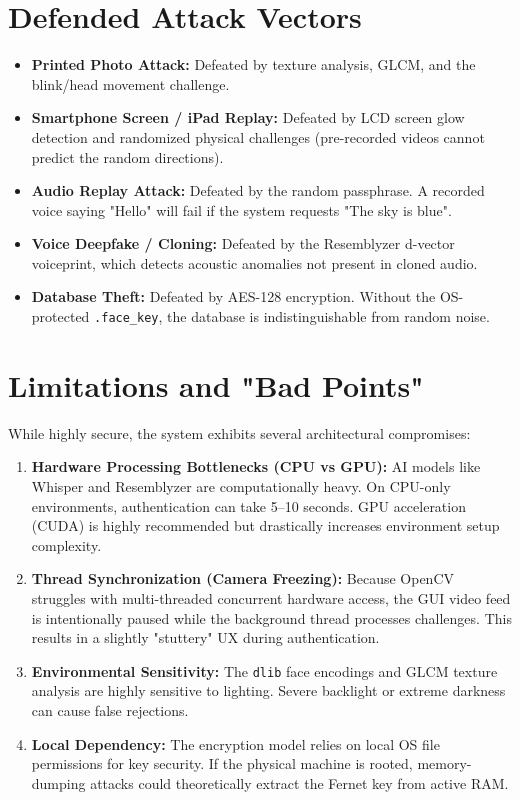 \documentclass[12pt,a4paper]{article}
\begin{document}
\section{Defended Attack Vectors}
\begin{itemize}
    \item \textbf{Printed Photo Attack:} Defeated by texture analysis, GLCM, and the blink/head movement challenge.
    \item \textbf{Smartphone Screen / iPad Replay:} Defeated by LCD screen glow detection and randomized physical challenges (pre-recorded videos cannot predict the random directions).
    \item \textbf{Audio Replay Attack:} Defeated by the random passphrase. A recorded voice saying "Hello" will fail if the system requests "The sky is blue".
    \item \textbf{Voice Deepfake / Cloning:} Defeated by the Resemblyzer d-vector voiceprint, which detects acoustic anomalies not present in cloned audio.
    \item \textbf{Database Theft:} Defeated by AES-128 encryption. Without the OS-protected \texttt{.face\_key}, the database is indistinguishable from random noise.
\end{itemize}

\section{Limitations and "Bad Points"}
While highly secure, the system exhibits several architectural compromises:
\begin{enumerate}
    \item \textbf{Hardware Processing Bottlenecks (CPU vs GPU):} AI models like Whisper and Resemblyzer are computationally heavy. On CPU-only environments, authentication can take 5--10 seconds. GPU acceleration (CUDA) is highly recommended but drastically increases environment setup complexity.
    \item \textbf{Thread Synchronization (Camera Freezing):} Because OpenCV struggles with multi-threaded concurrent hardware access, the GUI video feed is intentionally paused while the background thread processes challenges. This results in a slightly "stuttery" UX during authentication.
    \item \textbf{Environmental Sensitivity:} The \texttt{dlib} face encodings and GLCM texture analysis are highly sensitive to lighting. Severe backlight or extreme darkness can cause false rejections.
    \item \textbf{Local Dependency:} The encryption model relies on local OS file permissions for key security. If the physical machine is rooted, memory-dumping attacks could theoretically extract the Fernet key from active RAM.
\end{enumerate}
\end{document}
